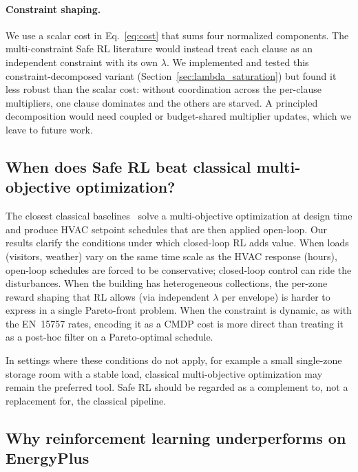 \paragraph{Constraint shaping.}
We use a scalar cost in Eq.~\eqref{eq:cost} that sums four normalized
components. The multi-constraint Safe RL literature would instead treat
each clause as an independent constraint with its own $\lambda$. We
implemented and tested this constraint-decomposed variant
(Section~\ref{sec:lambda_saturation}) but found it less robust than the
scalar cost: without coordination across the per-clause multipliers,
one clause dominates and the others are starved. A principled
decomposition would need coupled or budget-shared multiplier updates,
which we leave to future work.

\subsection{When does Safe RL beat classical multi-objective optimization?}

The closest classical baselines~\citep{ascione2018museum,schito2020museum}
solve a multi-objective optimization at design time and produce HVAC
setpoint schedules that are then applied open-loop. Our results clarify
the conditions under which closed-loop RL adds value. When loads
(visitors, weather) vary on the same time scale as the HVAC response
(hours), open-loop schedules are forced to be conservative; closed-loop
control can ride the disturbances. When the building has heterogeneous
collections, the per-zone reward shaping that RL allows (via
independent $\lambda$ per envelope) is harder to express in a single
Pareto-front problem. When the constraint is dynamic, as with the
EN~15757 rates, encoding it as a CMDP cost is more direct than
treating it as a post-hoc filter on a Pareto-optimal schedule.

In settings where these conditions do not apply, for example a small
single-zone storage room with a stable load, classical multi-objective
optimization may remain the preferred tool. Safe RL should be regarded
as a complement to, not a replacement for, the classical pipeline.

\subsection{Why reinforcement learning underperforms on EnergyPlus}

